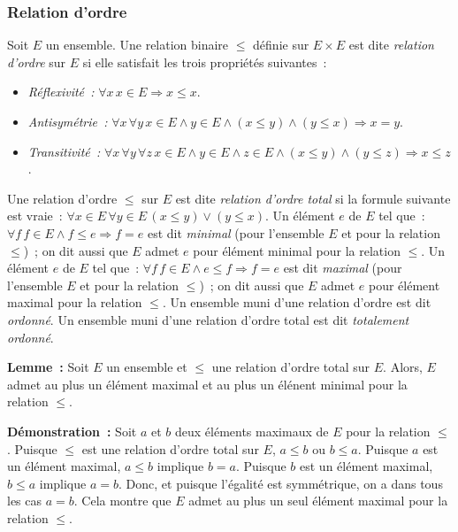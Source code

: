 \subsubsection{Relation d'ordre}

Soit $E$ un ensemble. 
Une relation binaire $\leq$ définie sur $E \times E$ est dite \textit{relation d'ordre} sur $E$ si elle satisfait les trois propriétés suivantes : 
\begin{itemize}[nosep]
    \item \textit{Réflexivité :} $\forall x \, x \in E \Rightarrow x \leq x$.
    \item \textit{Antisymétrie :} $\forall x \, \forall y \, x \in E \wedge y \in E \wedge (x \leq y) \wedge (y \leq x) \Rightarrow x = y$.
    \item \textit{Transitivité :} $\forall x \, \forall y \, \forall z \, x \in E \wedge y \in E \wedge z \in E \wedge (x \leq y) \mathrel{\wedge} (y \leq z) \Rightarrow x \leq z$.
\end{itemize}
Une relation d'ordre $\leq$ sur $E$ est dite \textit{relation d'ordre total} si la formule suivante est vraie : $\forall x \in E \, \forall y \in E \, (x \leq y) \vee (y \leq x)$.
Un élément $e$ de $E$ tel que : $\forall f \, f \in E \wedge f \leq e \Rightarrow f = e$ est dit \textit{minimal} (pour l'ensemble $E$ et pour la relation $\leq$) ; on dit aussi que $E$ admet $e$ pour élément minimal pour la relation $\leq$. 
Un élément $e$ de $E$ tel que : $\forall f \, f \in E \wedge e \leq f \Rightarrow f = e$ est dit \textit{maximal} (pour l'ensemble $E$ et pour la relation $\leq$) ; on dit aussi que $E$ admet $e$ pour élément maximal pour la relation $\leq$. 
Un ensemble muni d'une relation d'ordre est dit \textit{ordonné}.
Un ensemble muni d'une relation d'ordre total est dit \textit{totalement ordonné}.

\medskip

\noindent\textbf{Lemme :} Soit $E$ un ensemble et $\leq$ une relation d'ordre total sur $E$. 
    Alors, $E$ admet au plus un élément maximal et au plus un élénent minimal pour la relation $\leq$. 

\medskip

\noindent\textbf{Démonstration :} 
    Soit $a$ et $b$ deux éléments maximaux de $E$ pour la relation $\leq$.
    Puisque $\leq$ est une relation d'ordre total sur $E$, $a \leq b$ ou $b \leq a$. 
    Puisque $a$ est un élément maximal, $a \leq b$ implique $b = a$.
    Puisque $b$ est un élément maximal, $b \leq a$ implique $a = b$.
    Donc, et puisque l'égalité est symmétrique, on a dans tous les cas $a = b$.
    Cela montre que $E$ admet au plus un seul élément maximal pour la relation $\leq$.
    
